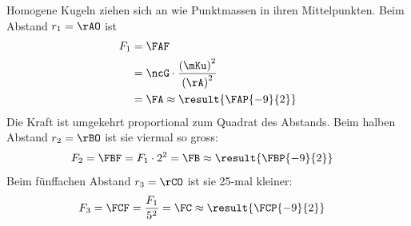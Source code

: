 \begin{center}
\end{center}

Homogene Kugeln ziehen sich an wie Punktmassen in ihren Mittelpunkten. Beim Abstand $r_1 = \rAO$ ist
\begin{align}
 F_1 &= \FAF \\
   &= \ncG\cdot\frac{\left(\mKu\right)^2}{\left(\rA\right)^2} \\
   &= \FA \approx \result{\FAP{-9}{2}}
\end{align}
Die Kraft ist umgekehrt proportional zum Quadrat des Abstands. Beim halben Abstand $r_2 = \rBO$ ist sie viermal so gross:
\begin{align}
 F_2 &= \FBF = F_1\cdot 2^2 = \FB \approx \result{\FBP{-9}{2}}
\end{align}
Beim fünffachen Abstand $r_3 = \rCO$ ist sie 25-mal kleiner:
\begin{align}
 F_3 &= \FCF = \frac{F_1}{5^2} = \FC \approx \result{\FCP{-9}{2}}
\end{align}
